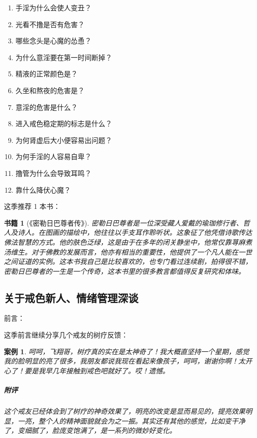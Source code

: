 \documentclass{ctexart}
\newtheorem{book}{书籍}
\newtheorem{case}{案例}
\begin{document}
\begin{multicols}{2}
\begin{enumerate}
        \item 手淫为什么会使人变丑？
        \item 光看不撸是否有危害？
        \item 哪些念头是心魔的怂恿？
        \item 为什么意淫要在第一时间断掉？
        \item 精液的正常颜色是？
        \item 久坐和熬夜的危害是？
        \item 意淫的危害是什么？
        \item 进入戒色稳定期的标志是什么？
        \item 为何肾虚后大小便容易出问题？
        \item 为何手淫的人容易自卑？
        \item 撸管为什么会导致耳鸣？
        \item 靠什么降伏心魔？
    \end{enumerate}
\end{multicols}

这季推荐 1 本书：

\begin{book}[《密勒日巴尊者传》]
    密勒日巴尊者是一位深受藏人爱戴的瑜珈修行者、哲人及诗人。在图画的描绘中，他往往以手支耳作聆听状。这象征了他凭借诗歌传达佛法智慧的方式。他的肤色泛绿，这是由于在多年的闭关静坐中，他常仅靠荨麻煮汤维生。对于佛教的发展而言，他亦有相当的重要性，他提供了一个凡人能在一世之间证道的实例。这本书我自己是比较喜欢的，也专门看过连续剧，拍得很不错，密勒日巴尊者的一生是一个传奇，这本书里的很多教言都值得反复研究和体味。
\end{book}

\subsection{关于戒色新人、情绪管理深谈}

前言：

这季前言继续分享几个戒友的树疗反馈：

\begin{case}
    呵呵，飞翔哥，树疗真的实在是太神奇了！我大概直坚持一个星期，感觉我的脸明显的亮了很多，我朋友都说我现在看起来像孩子，呵呵，谢谢你啊！太开心了！要是我早几年接触到戒色吧就好了。哎！遗憾。

    \subparagraph{附评} 这个戒友已经体会到了树疗的神奇效果了，明亮的改变是显而易见的，提亮效果明显，一亮，整个人的精神面貌就会为之一振。其实还有其他的感觉，比如变干净了，变细腻了，脸庞变饱满了，是一系列的微妙好变化。
\end{case}
\end{document}
